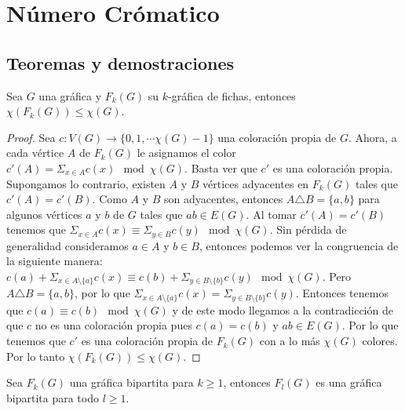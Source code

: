 \chapter{N\'umero Cr\'omatico}%
\label{cap:num cromatico}

\section{Teoremas y demostraciones}%


\begin{teorema}
\label{teo:num cromatico de G y F(G)}
    Sea $G$ una gr\'afica y $F_k(G)$ su $k$-gr\'afica de fichas, entonces
    $\chi(F_k(G)) \leq \chi (G)$.
\end{teorema}

\begin{proof}
    Sea $c: V(G) \to \{0,1, \cdots \chi(G)-1\}$ una coloraci\'on propia de $G$.
    Ahora, a cada v\'ertice $A$ de $F_k(G)$ le asignamos el color $ c'(A)=
    \Sigma_{x \in A}c(x) \mod \chi(G)$. Basta ver que $c'$ es una coloraci\'on
    propia. Supongamos lo contrario, existen $A$ y $B$ v\'ertices adyacentes en
    $F_k(G)$ tales que $c'(A) = c'(B)$. Como $A$ y $B$ son adyacentes, entonces
    $A \triangle B = \{a,b\}$ para algunos v\'ertices $a$ y $b$ de $G$ tales que
    $ab \in E(G)$. Al tomar $c'(A) = c'(B)$ tenemos que $\Sigma_{x \in A}c(x)
    \equiv \Sigma_{y \in B}c(y) \mod \chi(G)$. Sin p\'erdida de generalidad
    consideramos $a \in A$ y $b \in B$, entonces podemos ver la congruencia de
    la siguiente manera: $c(a) + \Sigma_{x \in A \setminus\{a\}}c(x) \equiv c(b)
    + \Sigma_{y \in B\setminus\{b\}}c(y) \mod \chi(G)$. Pero $A \triangle B =
    \{a,b\}$, por lo que $\Sigma_{x \in A\setminus\{a\}}c(x)=\Sigma_{y \in
    B\setminus\{b\}}c(y)$. Entonces tenemos que $c(a) \equiv c(b) \mod \chi(G)$
    y de este modo llegamos a la contradicci\'on de que $c$ no es una
    coloraci\'on propia pues $c(a) = c(b)$ y $ab \in E(G)$. Por lo que tenemos
    que $c'$ es una coloraci\'on propia de $F_k(G)$ con a lo m\'as $\chi (G)$
    colores. Por lo tanto $\chi(F_k(G)) \leq \chi (G)$.
\end{proof}

\begin{proposicion}
\label{prop:biparticion F(G)}
    Sea $F_k(G)$ una gr\'afica bipartita para $k \geq 1$, entonces $F_l(G)$
    es una gr\'afica bipartita para todo $l \geq 1$.
\end{proposicion}

